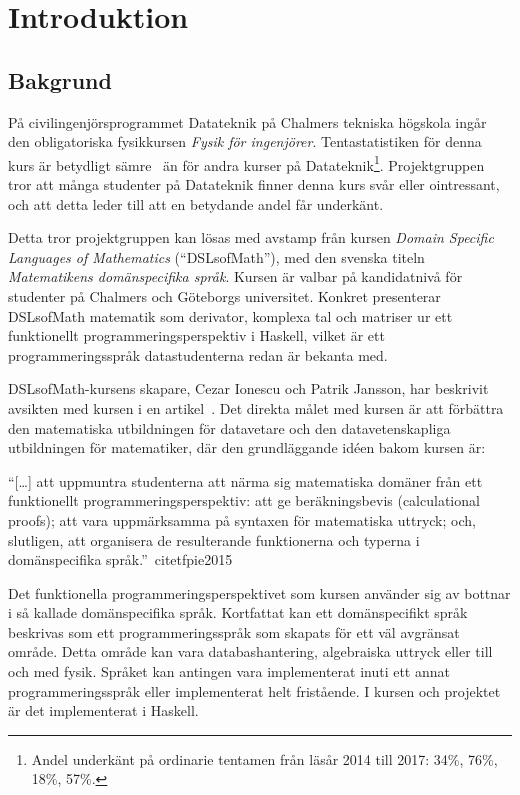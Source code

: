 
\chapter{Introduktion}

\section{Bakgrund}

På civilingenjörsprogrammet Datateknik på Chalmers tekniska högskola ingår den obligatoriska
fysikkursen \textit{Fysik för ingenjörer}. Tentastatistiken för denna kurs är
betydligt sämre~\cite{tentastatistik} än för andra kurser på Datateknik\footnote{Andel underkänt på
ordinarie tentamen från läsår 2014 till 2017: 34\%, 76\%, 18\%, 57\%.
}. Projektgruppen tror att många studenter på Datateknik finner denna
kurs svår eller ointressant, och att detta leder till att en betydande andel får
underkänt.

Detta tror projektgruppen kan lösas med avstamp från kursen \textit{Domain
Specific Languages of Mathematics} (``DSLsofMath''), med den svenska titeln
\textit{Matematikens domänspecifika språk}. Kursen är valbar på kandidatnivå för studenter på Chalmers och Göteborgs universitet. Konkret
presenterar DSLsofMath matematik som derivator, komplexa tal och
matriser ur ett funktionellt programmeringsperspektiv i Haskell, vilket är ett programmeringsspråk datastudenterna redan är bekanta med.

DSLsofMath-kursens skapare, Cezar Ionescu och Patrik Jansson, har beskrivit avsikten med kursen i en artikel~\cite{tfpie2015}. Det direkta målet med kursen är
att förbättra den matematiska utbildningen för datavetare och den
datavetenskapliga utbildningen för matematiker, där den grundläggande idéen
bakom kursen är:

\begin{center} ``[\dots] att uppmuntra studenterna att närma sig matematiska
  domäner från ett funktionellt programmeringsperspektiv: att ge beräkningsbevis
  (calculational proofs); att vara uppmärksamma på syntaxen för matematiska
  uttryck; och, slutligen, att organisera de resulterande funktionerna och
typerna i domänspecifika språk.''~cite{tfpie2015}~\cite{lecture-notes}\
\end{center}

Det funktionella programmeringsperspektivet som kursen använder sig av bottnar i
så kallade domänspecifika språk. Kortfattat kan ett domänspecifikt språk
beskrivas som ett programmeringsspråk som skapats för ett väl avgränsat
område. Detta område kan vara databashantering, algebraiska uttryck eller till
och med fysik. Språket kan antingen vara implementerat inuti ett annat
programmeringsspråk eller implementerat helt fristående. I kursen och projektet 
är det implementerat i Haskell.

